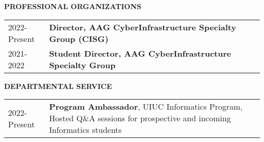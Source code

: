 \documentclass{acmcv}
\begin{document}
    \textbf{\uppercase{Professional Organizations}}
    \begin{longtable}{p{0.16\linewidth} p{0.84\linewidth}}

        2022-Present & \textbf{Director, AAG CyberInfrastructure Specialty Group (CISG)} \\

        2021-2022 & \textbf{Student Director, AAG CyberInfrastructure Specialty Group}
    \end{longtable}

    \textbf{\uppercase{Departmental Service}}
    \begin{longtable}{p{0.16\linewidth} p{0.84\linewidth}}
        2022-Present & \textbf{Program Ambassador}, UIUC Informatics Program, Hosted Q\&A sessions for prospective and incoming Informatics students \\
    \end{longtable}


	
		
		
		
\end{document}
